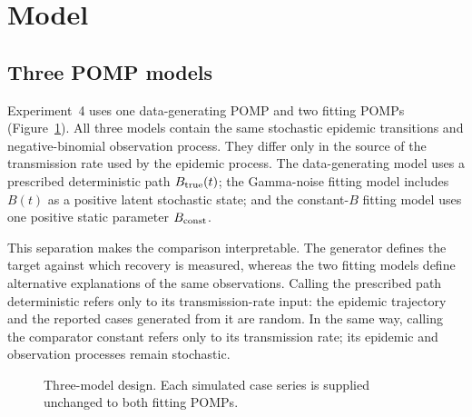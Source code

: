 \section{Model}
\label{sec:model}

\subsection{Three POMP models}

Experiment~4 uses one data-generating POMP and two fitting POMPs
(Figure~\ref{fig:model-hierarchy}).  All three models contain the same
stochastic epidemic transitions and negative-binomial observation process.
They differ only in the source of the transmission rate used by the epidemic
process.  The data-generating model uses a prescribed deterministic path
\(B_{\mathrm{true}}(t)\); the Gamma-noise fitting model includes \(B(t)\) as a positive
latent stochastic state; and the constant-\(B\) fitting model uses one positive
static parameter \(B_{\mathrm{const}}\).

This separation makes the comparison interpretable.  The generator defines
the target against which recovery is measured, whereas the two fitting models
define alternative explanations of the same observations.  Calling the
prescribed path deterministic refers only to its transmission-rate input: the
epidemic trajectory and the reported cases generated from it are random.  In
the same way, calling the comparator constant refers only to its transmission
rate; its epidemic and observation processes remain stochastic.

\begin{figure}[htbp]
\centering
{}
\caption{Three-model design.  Each simulated case series is supplied unchanged
to both fitting POMPs.}
\label{fig:model-hierarchy}
\end{figure}

